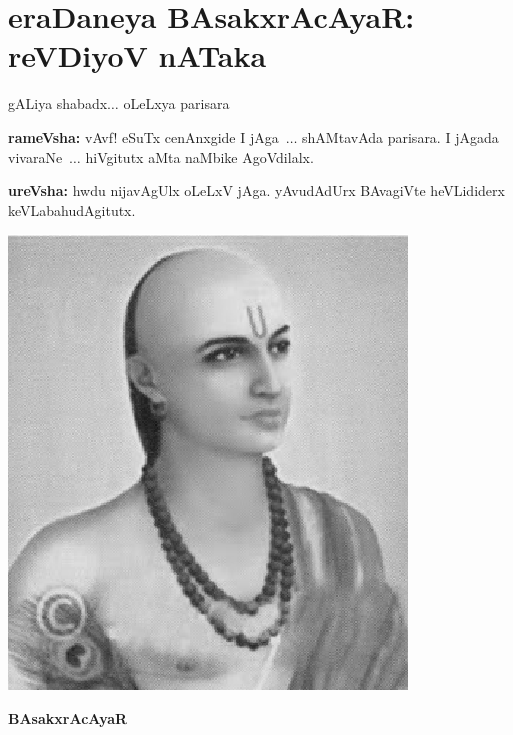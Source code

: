 \chapter[eraDaneya BAsakxrAcAyaR : reVDiyoV nATaka]{eraDaneya BAsakxrAcAyaR\break : reVDiyoV nATaka}

\begin{minipage}[l]{6.5cm}
\qquad gALiya shabadx$\ldots$ oLeLxya parisara

\smallskip

\smallskip

{\bf rameVsha:} vAvf! eSuTx cenAnxgide I jAga~$\ldots$ shAMtavAda parisara. I jAgada vivaraNe~$\ldots$ hiVgitutx aMta naMbike AgoVdilalx.

\medskip
\smallskip

{\bf ureVsha:} hwdu nijavAgUlx oLeLxV jAga. yAvudAdUrx BAvagiVte heVLididerx keVLabahudAgitutx.

\medskip
\medskip
\end{minipage}
\begin{minipage}[l]{4cm}
  \centering\includegraphics[scale=0.8]{src/figures/bhaskaracharya-II.eps}
  
  {\bf BAsakxrAcAyaR}
    \end{minipage}
    
